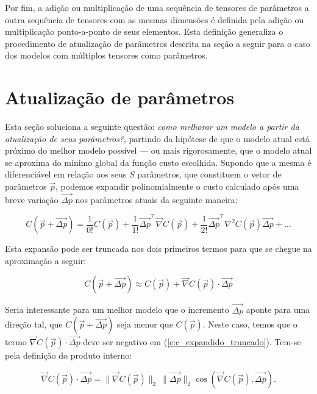     Por fim, a adição ou multiplicação de uma sequência de tensores de parâmetros a outra sequência de tensores com as mesmas dimensões é definida pela adição ou multiplicação ponto-a-ponto de seus elementos. Esta definição generaliza o procedimento de atualização de parâmetros descrita na seção a seguir para o caso dos modelos com múltiplos tensores como parâmetros.


  \section{Atualização de parâmetros} \label{s:metodos_gradiente}

    Esta seção soluciona a seguinte questão: \emph{como melhorar um modelo a partir da atualização de seus parâmetros?}, partindo da hipótese de que o modelo atual está próximo do melhor modelo possível --- ou mais rigorosamente, que o modelo atual se aproxima do mínimo global da função custo escolhida. Supondo que a mesma é diferenciável em relação aos seus $S$ parâmetros, que constituem o vetor de parâmetros $\vec{p}$, podemos expandir polinomialmente o custo calculado após uma breve variação $\vec{\Delta p}$ nos parâmetros atuais da seguinte maneira:

    \begin{equation} \label{e:c_expandido}
      C(\vec{p} + \vec{\Delta p}) =
      \frac{1}{0!} C(\vec{p}) +
      \frac{1}{1!} \vec{\Delta p}^{\top} \vec{\nabla} C(\vec{p}) +
      \frac{1}{2!} \vec{\Delta p}^{\top} \nabla^2 C(\vec{p}) \vec{\Delta p} +
      \ldots
    \end{equation}

    Esta expansão pode ser truncada nos dois primeiros termos para que se chegue na aproximação a seguir:

    \begin{equation} \label{e:c_expandido_truncado}
      C(\vec{p} + \vec{\Delta p}) \approx
      C(\vec{p}) +
      \vec{\nabla} C(\vec{p}) \cdot \vec{\Delta p}
    \end{equation}

    Seria interessante para um melhor modelo que o incremento $\vec{\Delta p}$ aponte para uma direção tal, que $C(\vec{p} + \vec{\Delta p})$ seja menor que $C(\vec{p})$. Neste caso, temos que o termo $\vec{\nabla} C(\vec{p}) \cdot \vec{\Delta p}$ deve ser negativo em (\ref{e:c_expandido_truncado}). Tem-se pela definição do produto interno:

    \begin{equation} \label{e:grad_c_delta_p}
      \vec{\nabla} C(\vec{p}) \cdot \vec{\Delta p} = \|\vec{\nabla} C(\vec{p})\|_2\ \|\vec{\Delta p}\|_2 \cos(\vec{\nabla} C(\vec{p}), \vec{\Delta p})
      .
    \end{equation}

